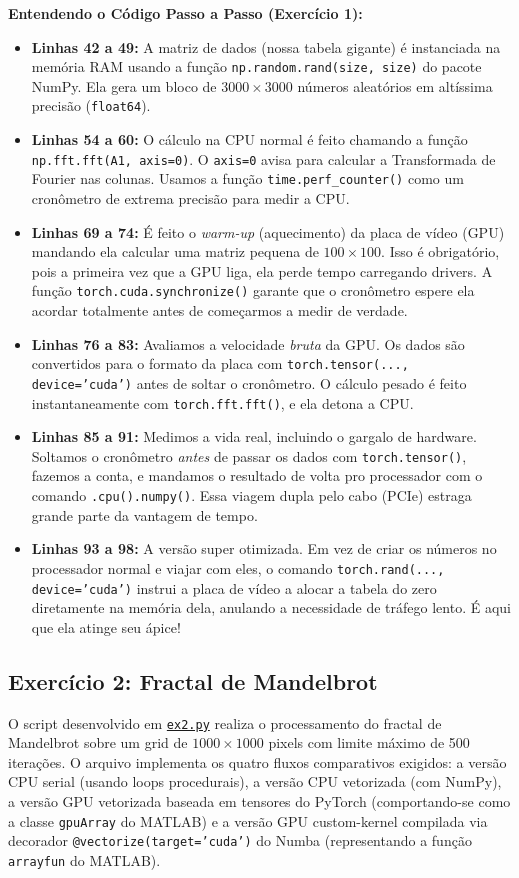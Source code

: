 \documentclass[12pt,a4paper]{article}
\begin{document}
\textbf{Entendendo o Código Passo a Passo (Exercício 1):}
\begin{itemize}
    \item \textbf{Linhas 42 a 49:} A matriz de dados (nossa tabela gigante) é instanciada na memória RAM usando a função \texttt{np.random.rand(size, size)} do pacote NumPy. Ela gera um bloco de $3000 \times 3000$ números aleatórios em altíssima precisão (\texttt{float64}).
    \item \textbf{Linhas 54 a 60:} O cálculo na CPU normal é feito chamando a função \texttt{np.fft.fft(A1, axis=0)}. O \texttt{axis=0} avisa para calcular a Transformada de Fourier nas colunas. Usamos a função \texttt{time.perf\_counter()} como um cronômetro de extrema precisão para medir a CPU.
    \item \textbf{Linhas 69 a 74:} É feito o \textit{warm-up} (aquecimento) da placa de vídeo (GPU) mandando ela calcular uma matriz pequena de $100 \times 100$. Isso é obrigatório, pois a primeira vez que a GPU liga, ela perde tempo carregando drivers. A função \texttt{torch.cuda.synchronize()} garante que o cronômetro espere ela acordar totalmente antes de começarmos a medir de verdade.
    \item \textbf{Linhas 76 a 83:} Avaliamos a velocidade \textit{bruta} da GPU. Os dados são convertidos para o formato da placa com \texttt{torch.tensor(..., device='cuda')} antes de soltar o cronômetro. O cálculo pesado é feito instantaneamente com \texttt{torch.fft.fft()}, e ela detona a CPU.
    \item \textbf{Linhas 85 a 91:} Medimos a vida real, incluindo o gargalo de hardware. Soltamos o cronômetro \textit{antes} de passar os dados com \texttt{torch.tensor()}, fazemos a conta, e mandamos o resultado de volta pro processador com o comando \texttt{.cpu().numpy()}. Essa viagem dupla pelo cabo (PCIe) estraga grande parte da vantagem de tempo.
    \item \textbf{Linhas 93 a 98:} A versão super otimizada. Em vez de criar os números no processador normal e viajar com eles, o comando \texttt{torch.rand(..., device='cuda')} instrui a placa de vídeo a alocar a tabela do zero diretamente na memória dela, anulando a necessidade de tráfego lento. É aqui que ela atinge seu ápice!
\end{itemize}

\subsection{Exercício 2: Fractal de Mandelbrot}
O script desenvolvido em \href{file:///c:/Users/mufas/OneDrive/Área de Trabalho/Faculdade/Arq_desemp/ex2.py}{\texttt{ex2.py}} realiza o processamento do fractal de Mandelbrot sobre um grid de $1000 \times 1000$ pixels com limite máximo de 500 iterações. O arquivo implementa os quatro fluxos comparativos exigidos: a versão CPU serial (usando loops procedurais), a versão CPU vetorizada (com NumPy), a versão GPU vetorizada baseada em tensores do PyTorch (comportando-se como a classe \texttt{gpuArray} do MATLAB) e a versão GPU custom-kernel compilada via decorador \texttt{@vectorize(target='cuda')} do Numba (representando a função \texttt{arrayfun} do MATLAB).
\end{document}
